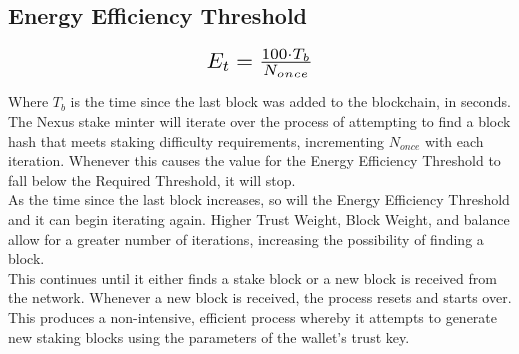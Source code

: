 \documentclass[11pt]{article}
\begin{document}
\subsection{Energy Efficiency Threshold}

\begin{equation}
\resizebox{.22\hsize}{!}{$E_{t} = \frac{100 \cdot T_{b}}{N_{once}}$}
\end{equation}

\noindent Where $T_{b}$ is the time since the last block was added to the blockchain, in seconds.\\

\noindent The Nexus stake minter will iterate over the process of attempting to find a block hash that meets staking difficulty requirements, incrementing $N_{once}$ with each iteration. Whenever this causes the value for the Energy Efficiency Threshold to fall below the Required Threshold, it will stop.\\

\noindent As the time since the last block increases, so will the Energy Efficiency Threshold and it can begin iterating again. Higher Trust Weight, Block Weight, and balance allow for a greater number of iterations, increasing the possibility of finding a block.\\

\noindent This continues until it either finds a stake block or a new block is received from the network. Whenever a new block is received, the process resets and starts over.\\

\noindent This produces a non-intensive, efficient process whereby it attempts to generate new staking blocks using the parameters of the wallet’s trust key.\\
\end{document}
